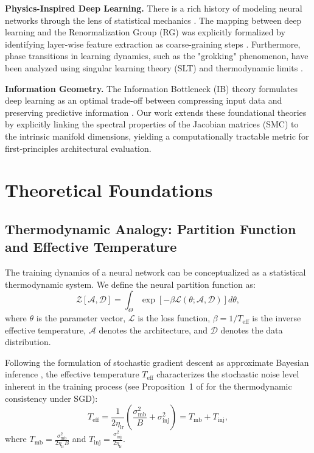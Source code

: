 \documentclass[11pt, a4paper]{article}
\theoremstyle{definition}
\begin{document}
\textbf{Physics-Inspired Deep Learning.} There is a rich history of modeling neural networks through the lens of statistical mechanics \cite{bahri2020statistical, roberts2022principles}. The mapping between deep learning and the Renormalization Group (RG) was explicitly formalized by identifying layer-wise feature extraction as coarse-graining steps \cite{mehta2014exact}. Furthermore, phase transitions in learning dynamics, such as the "grokking" phenomenon, have been analyzed using singular learning theory (SLT) and thermodynamic limits \cite{watanabe2009algebraic}.

\textbf{Information Geometry.} The Information Bottleneck (IB) theory formulates deep learning as an optimal trade-off between compressing input data and preserving predictive information \cite{tishby2015deep}. Our work extends these foundational theories by explicitly linking the spectral properties of the Jacobian matrices (SMC) to the intrinsic manifold dimensions, yielding a computationally tractable metric for first‑principles architectural evaluation.

\section{Theoretical Foundations}
\label{sec:foundations}

\subsection{Thermodynamic Analogy: Partition Function and Effective Temperature}
\label{subsec:thermo}

The training dynamics of a neural network can be conceptualized as a statistical thermodynamic system. We define the neural partition function as:
\begin{equation}
    \mathcal{Z}[\mathcal{A}, \mathcal{D}] = \int_{\Theta} \exp\left[-\beta \mathcal{L}(\theta; \mathcal{A}, \mathcal{D})\right] d\theta,
\end{equation}
where $\theta$ is the parameter vector, $\mathcal{L}$ is the loss function, $\beta = 1/T_{\text{eff}}$ is the inverse effective temperature, $\mathcal{A}$ denotes the architecture, and $\mathcal{D}$ denotes the data distribution.

Following the formulation of stochastic gradient descent as approximate Bayesian inference \cite{mandt2017stochastic, smith2017don}, the effective temperature $T_{\text{eff}}$ characterizes the stochastic noise level inherent in the training process (see Proposition~1 of \cite{liu2024unified} for the thermodynamic consistency under SGD):
\begin{equation}
    T_{\text{eff}} = \frac{1}{2\eta_{\text{lr}}}\left(\frac{\sigma_{\text{mb}}^2}{B} + \sigma_{\text{inj}}^2\right) = T_{\text{mb}} + T_{\text{inj}},
\end{equation}
where $T_{\text{mb}} = \frac{\sigma_{\text{mb}}^2}{2\eta_{\text{lr}}B}$ and $T_{\text{inj}} = \frac{\sigma_{\text{inj}}^2}{2\eta_{\text{lr}}}$.
\end{document}
